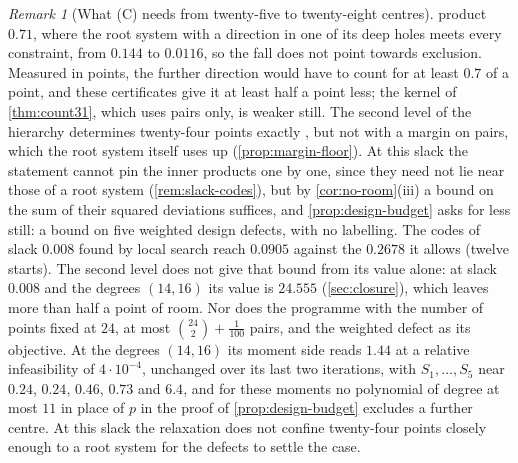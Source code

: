 \documentclass[11pt,reqno]{amsart}
\renewcommand{\_}{\origunderscore\allowbreak}
\numberwithin{equation}{section}
\theoremstyle{plain}
\theoremstyle{definition}
\theoremstyle{remark}
\newtheorem{remark}[thm]{Remark}
\begin{document}
\begin{remark}[What (C) needs from twenty-five to twenty-eight centres]
{  product $0.71$, where the root system with a direction in one of its deep
  holes meets every constraint, from $0.144$ to $0.0116$, so the fall does
  not point towards exclusion.} Measured in points, the further direction
would have to count for at least $0.7$ of a point, and these certificates
give it at least half a point less; the kernel of \cref{thm:count31}, which
uses pairs only, is weaker still. The second level of the hierarchy
determines twenty-four points exactly \cite{LLM24}, but not with a margin on
pairs, which the root system itself uses up (\cref{prop:margin-floor}).
At this slack the statement cannot pin the inner products one by one,
since they need not lie near those of a root system
(\cref{rem:slack-codes}), but by \cref{cor:no-room}(iii) a bound on the sum
of their squared deviations suffices, and \cref{prop:design-budget} asks
for less still: a bound on five weighted design defects, with no labelling.
The codes of slack $0.008$ found by local search reach $0.0905$ against the
$0.2678$ it allows (twelve starts). The second level does not give that
bound from its value alone: at slack $0.008$ and the degrees $(14,16)$ its
value is $24.555$ (\cref{sec:closure}), which leaves more than half a point
of room. Nor does the programme with the number of points fixed at $24$,
at most $\binom{24}2+\frac1{100}$ pairs, and the weighted defect as its
objective. At the degrees $(14,16)$ its moment side reads $1.44$ at a
relative infeasibility of $4\cdot10^{-4}$, unchanged over its last two
iterations, with $S_1,\dots,S_5$ near $0.24$, $0.24$, $0.46$, $0.73$ and
$6.4$, and for these moments no polynomial of degree at most $11$ in place
of $p$ in the proof of \cref{prop:design-budget} excludes a further centre.
At this slack the relaxation does not confine twenty-four points closely
enough to a root system for the defects to settle the case.


\end{remark}
\end{document}

